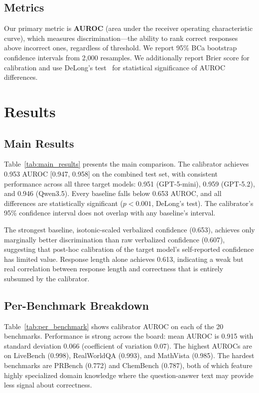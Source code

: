 \documentclass{colm2026}
\begin{document}
\subsection{Metrics}
Our primary metric is \textbf{AUROC} (area under the receiver operating characteristic curve), which measures discrimination---the ability to rank correct responses above incorrect ones, regardless of threshold. We report 95\% BCa bootstrap confidence intervals from 2,000 resamples. We additionally report Brier score for calibration and use DeLong's test~\citep{delong1988comparing} for statistical significance of AUROC differences.

\section{Results}
\label{sec:results}

\subsection{Main Results}

Table~\ref{tab:main_results} presents the main comparison. The calibrator achieves 0.953 AUROC [0.947, 0.958] on the combined test set, with consistent performance across all three target models: 0.951 (GPT-5-mini), 0.959 (GPT-5.2), and 0.946 (Qwen3.5). Every baseline falls below 0.653 AUROC, and all differences are statistically significant ($p < 0.001$, DeLong's test). The calibrator's 95\% confidence interval does not overlap with any baseline's interval.

The strongest baseline, isotonic-scaled verbalized confidence (0.653), achieves only marginally better discrimination than raw verbalized confidence (0.607), suggesting that post-hoc calibration of the target model's self-reported confidence has limited value. Response length alone achieves 0.613, indicating a weak but real correlation between response length and correctness that is entirely subsumed by the calibrator.

\subsection{Per-Benchmark Breakdown}

Table~\ref{tab:per_benchmark} shows calibrator AUROC on each of the 20 benchmarks. Performance is strong across the board: mean AUROC is 0.915 with standard deviation 0.066 (coefficient of variation 0.07). The highest AUROCs are on LiveBench (0.998), RealWorldQA (0.993), and MathVista (0.985). The hardest benchmarks are PRBench (0.772) and ChemBench (0.787), both of which feature highly specialized domain knowledge where the question-answer text may provide less signal about correctness.
\end{document}
